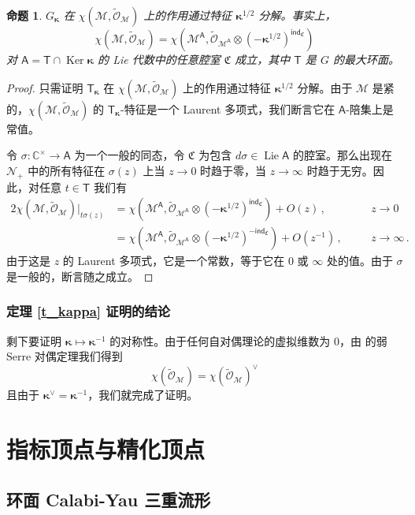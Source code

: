 \documentclass[12pt]{article}
\newcommand{\C}{\mathbb{C}}
\newcommand{\cN}{\mathscr{N}}
\newcommand{\cM}{\mathcal{M}}
\newcommand{\fC}{\mathfrak{C}}
\DeclareMathOperator{\Lie}{Lie}
\DeclareMathOperator{\Ker}{Ker}
\newcommand{\sind}{\mathsf{ind}}
\newcommand{\tO}{\widetilde{\mathscr{O}}}
\newcommand{\bT}{\mathsf{T}}
\newcommand{\bA}{\mathsf{A}}
\newcommand{\bk}{\boldsymbol{\kappa}}
\newcommand{\Gk}{G_{\bk}}
\newtheorem{Proposition}[Lemma]{命题}
\theoremstyle{definition}
\begin{document}
\begin{Proposition}\label{p_rig}
$\Gk$ 在 $\chi(\cM,\tO_{\cM})$ 上的作用通过特征 $\bk^{1/2}$ 分解。事实上，
\begin{equation}
  \label{eq:11}
  \chi(\cM,\tO_{\cM}) = \chi\left(\cM^{\bA}, \tO_{\cM^{\bA}}  \otimes
    (-\bk^{1/2})^{\sind_{\fC}} \right)
\end{equation}
对 $\bA = \bT \cap \Ker \bk$ 的 Lie 代数中的任意腔室 $\fC$ 成立，其中 $\bT$ 是 $G$ 的最大环面。
\end{Proposition}
\begin{proof}
只需证明 $\bT_{\bk}$ 在 $\chi(\cM,\tO_{\cM})$ 上的作用通过特征 $\bk^{1/2}$ 分解。由于 $\cM$ 是紧的，$\chi(\cM,\tO_{\cM})$ 的 $\bT_{\bk}$-特征是一个 Laurent 多项式，我们断言它在 $\bA$-陪集上是常值。

令 $\sigma: \C^{\times} \to \bA$ 为一个一般的同态，令 $\fC$ 为包含 $d\sigma \in \Lie\bA$ 的腔室。那么出现在 $\cN_+$ 中的所有特征在 $\sigma(z)$ 上当 $z\to 0$ 时趋于零，当 $z\to\infty$ 时趋于无穷。因此，对任意 $t\in\bT$ 我们有
\begin{alignat*}{2}
   \chi(\cM,\tO_{\cM})\big|_{t \sigma(z)}
 &= \chi\left(\cM^{\bA}, \tO_{\cM^{\bA}}  \otimes
    (-\bk^{1/2})^{\sind_{\fC}} \right)  + O(z)\,, \quad &&z\to 0 \\
&= \chi\left(\cM^{\bA}, \tO_{\cM^{\bA}}  \otimes
    (-\bk^{1/2})^{-\sind_{\fC}} \right)  + O(z^{-1})\,, \quad &&z\to \infty
  \,.
\end{alignat*}
由于这是 $z$ 的 Laurent 多项式，它是一个常数，等于它在 $0$ 或 $\infty$ 处的值。由于 $\sigma$ 是一般的，断言随之成立。
\end{proof}

\subsubsection{定理 \ref{t_kappa} 证明的结论}

剩下要证明 $\bk\mapsto\bk^{-1}$ 的对称性。由于任何自对偶理论的虚拟维数为 $0$，由 \cite{FG} 的弱 Serre 对偶定理我们得到
$$
\chi(\tO_{\cM}) = \chi(\tO_{\cM})^{\vee}
$$
且由于 $\bk^{\vee} = \bk^{-1}$，我们就完成了证明。
\section{指标顶点与精化顶点} \label{s_index_vertex}

\subsection{环面 Calabi-Yau 三重流形}
\end{document}

